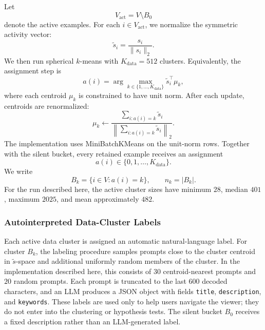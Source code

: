 \documentclass{article} %
\begin{document}
Let
\begin{equation}
V_{\text{act}} = V\setminus B_0
\end{equation}
denote the active examples. For each $i\in V_{\text{act}}$, we normalize the symmetric activity vector:
\begin{equation}
\tilde{s}_i = \frac{s_i}{\|s_i\|_2}.
\end{equation}
We then run spherical $k$-means with $K_{\text{data}}=512$ clusters. Equivalently, the assignment step is
\begin{equation}
a(i) = \arg\max_{k\in\{1,\ldots,K_{\text{data}}\}} \tilde{s}_i^\top \mu_k,
\end{equation}
where each centroid $\mu_k$ is constrained to have unit norm. After each update, centroids are renormalized:
\begin{equation}
\mu_k \leftarrow \frac{\sum_{i:a(i)=k}\tilde{s}_i}{\left\|\sum_{i:a(i)=k}\tilde{s}_i\right\|_2}.
\end{equation}
The implementation uses MiniBatchKMeans on the unit-norm rows. Together with the silent bucket, every retained example receives an assignment
\begin{equation}
a(i)\in\{0,1,\ldots,K_{\text{data}}\}.
\end{equation}
We write
\begin{equation}
B_k = \{i\in V : a(i)=k\}, \qquad n_k=|B_k|.
\end{equation}
For the run described here, the active cluster sizes have minimum $28$, median $401$, maximum $2025$, and mean approximately $482$.

\subsubsection{Autointerpreted Data-Cluster Labels}
\label{app:ftd-autointerp}

Each active data cluster is assigned an automatic natural-language label. For cluster $B_k$, the labeling procedure samples prompts close to the cluster centroid in $\tilde{s}$-space and additional uniformly random members of the cluster. In the implementation described here, this consists of $30$ centroid-nearest prompts and $20$ random prompts. Each prompt is truncated to the last $600$ decoded characters, and an LLM produces a JSON object with fields \texttt{title}, \texttt{description}, and \texttt{keywords}. These labels are used only to help users navigate the viewer; they do not enter into the clustering or hypothesis tests. The silent bucket $B_0$ receives a fixed description rather than an LLM-generated label.
\end{document}
